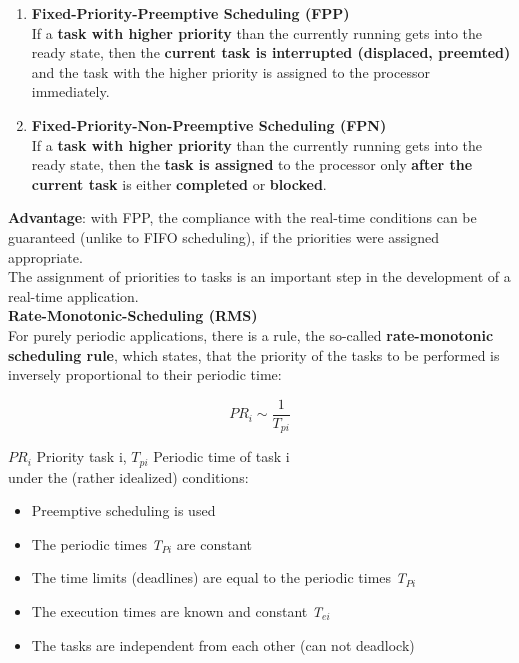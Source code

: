 \begin{enumerate}
	\item  \textbf{Fixed-Priority-Preemptive Scheduling (FPP)}\\
	If a \textbf{task with higher priority} than the currently running gets into the ready state, then the \textbf{current task is interrupted (displaced, preemted)} and the task with the higher priority is assigned to the processor immediately.
	
	\item  \textbf{Fixed-Priority-Non-Preemptive Scheduling (FPN)}\\
	If a \textbf{task with higher priority} than the currently running gets into the ready state, then the \textbf{task is assigned} to the processor only \textbf{after the current task} is either \textbf{completed} or \textbf{blocked}.
\end{enumerate}

\textbf{Advantage}: with FPP, the compliance with the real-time conditions can be guaranteed (unlike to FIFO scheduling), if the priorities were assigned appropriate. \\

The assignment of priorities to tasks is an important step in the development of a real-time application.\\

{\rot\bf Rate-Monotonic-Scheduling (RMS)}\\

For purely periodic applications, there is a rule, the so-called \textbf{rate-monotonic scheduling rule}, which states, that the priority of the tasks to be performed is inversely proportional to their periodic time:

\begin{equation}
	PR_{i} \sim \frac{1}{T_{pi} } 
\label{EQ }
\end{equation}

$PR_i$ Priority task i, $T_{pi}$ Periodic time of task i\\

under the (rather idealized) conditions:

\begin{itemize}
	\item  Preemptive scheduling is used
	\item  The periodic times \textit{T${}_{Pi}$} are constant 		
	\item  The time limits (deadlines) are equal to the periodic times \textit{T${}_{Pi}$}
	\item  The execution times are known and constant \textit{T${}_{ei}$}
	\item  The tasks are independent from each other (can not deadlock)
\end{itemize}

